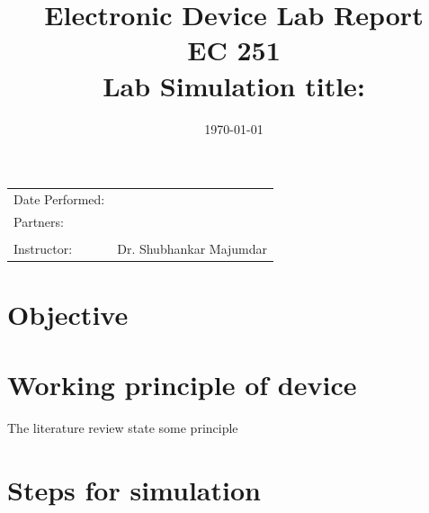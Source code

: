 \documentclass{article}
\title{Electronic Device Lab  Report \\ EC 251 \\ Lab Simulation title:  } %
\author{} %
\date{\today} %
\begin{document}
\maketitle %

\begin{center}
\begin{tabular}{l r}
Date Performed: & \\ %
Partners: &\\ %
&\\
Instructor: &  Dr. Shubhankar Majumdar %
\end{tabular}
\end{center}



\section{Objective}





 

\section{Working principle of device} %
The literature review state some principle \cite{Smith:2012qr}


\section{Steps for simulation}
\end{document}
